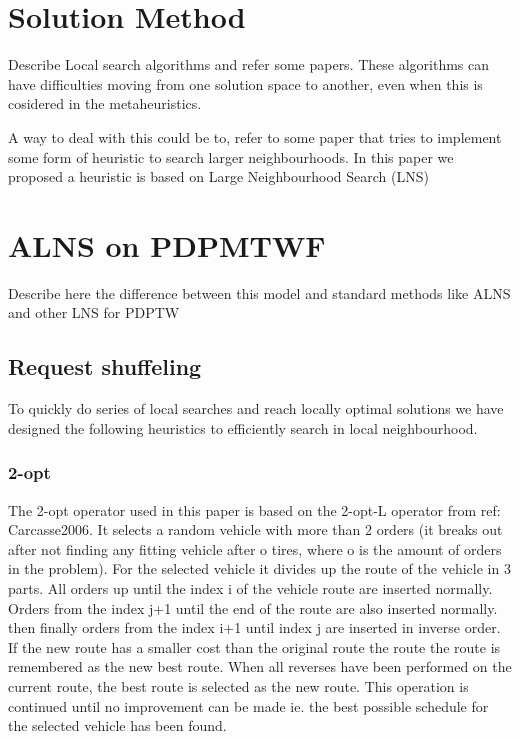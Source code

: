 \documentclass[a4paper,10pt]{article}
\begin{document}

\section{Solution Method}
Describe Local search algorithms and refer some papers. 
These algorithms can have difficulties moving from one solution space to another, even when this is cosidered in the metaheuristics. \par
A way to deal with this could be to, refer to some paper that tries to implement some form of heuristic to search larger neighbourhoods.
In this paper we proposed a heuristic is based on \cite{shaw97} Large Neighbourhood Search (LNS) 

\section{ALNS on PDPMTWF}
Describe here the difference between this model and standard methods like ALNS and other LNS for PDPTW

\subsection{Request shuffeling}
To quickly do series of local searches and reach locally optimal solutions we have designed the following heuristics to efficiently search in local neighbourhood.

\subsubsection{2-opt}
The 2-opt operator used in this paper is based on the 2-opt-L operator from {ref: Carcasse2006}. 
It selects a random vehicle with more than 2 orders (it breaks out after not finding any fitting vehicle after o tires, where o is the amount of orders in the problem).
For the selected vehicle it divides up the route of the vehicle in 3 parts. 
All orders up until the index i of the vehicle route are inserted normally. 
Orders from the index j+1 until the end of the route are also inserted normally. 
then finally orders from the index i+1 until index j are inserted in inverse order.
If the new route has a smaller cost than the original route the route the route is remembered as the new best route. 
When all reverses have been performed on the current route, the best route is selected as the new route.
This operation is continued until no improvement can be made ie. the best possible schedule for the selected vehicle has been found.
\end{document}
